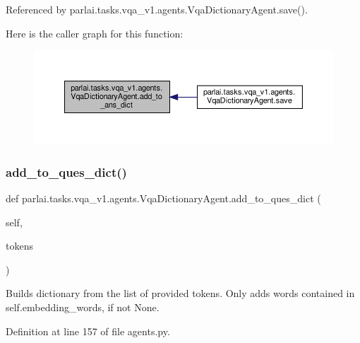Referenced by parlai.\+tasks.\+vqa\+\_\+v1.\+agents.\+Vqa\+Dictionary\+Agent.\+save().

Here is the caller graph for this function\+:
\nopagebreak
\begin{figure}[H]
\begin{center}
\leavevmode
\includegraphics[width=350pt]{classparlai_1_1tasks_1_1vqa__v1_1_1agents_1_1VqaDictionaryAgent_a5a69f09a3f7a908c3e89f9b0b86f7396_icgraph}
\end{center}
\end{figure}
\mbox{\label{classparlai_1_1tasks_1_1vqa__v1_1_1agents_1_1VqaDictionaryAgent_aebfab302e4b8b2b4ac74723a047cca18}} 
\subsubsection{\texorpdfstring{add\+\_\+to\+\_\+ques\+\_\+dict()}{add\_to\_ques\_dict()}}
{\footnotesize\ttfamily def parlai.\+tasks.\+vqa\+\_\+v1.\+agents.\+Vqa\+Dictionary\+Agent.\+add\+\_\+to\+\_\+ques\+\_\+dict (\begin{DoxyParamCaption}\item[{}]{self,  }\item[{}]{tokens }\end{DoxyParamCaption})}

\begin{DoxyVerb}Builds dictionary from the list of provided tokens.
Only adds words contained in self.embedding_words, if not None.
\end{DoxyVerb}
 

Definition at line 157 of file agents.\+py.




